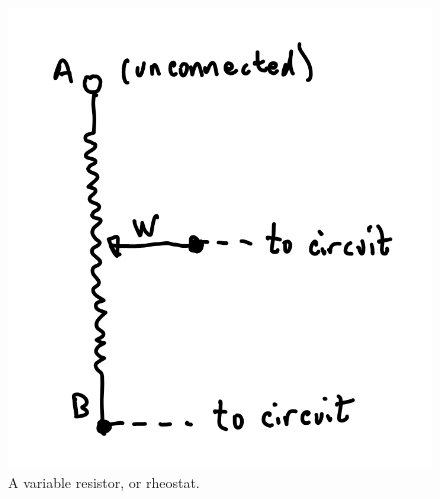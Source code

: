 \documentclass[11pt]{article} %
\begin{document}
\begin{figure}[htbp]
\begin{center}
\includegraphics{figures/rheostat}
\caption{A variable resistor, or rheostat.}
\label{fig:rheostat}
\end{center}
\end{figure}
\end{document}
